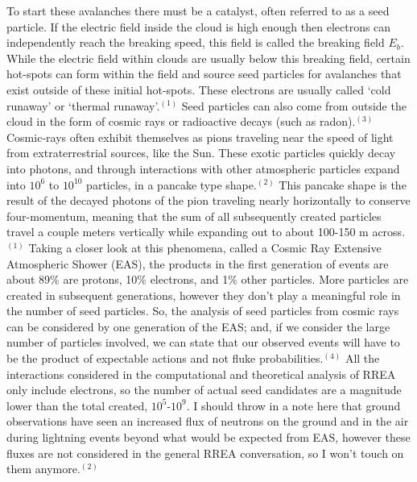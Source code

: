 \documentclass[11pt]{article}
\begin{document}
\begin{multicols*}{2}
    To start these avalanches there must be a catalyst, often referred to as a seed particle. If the electric field inside the cloud is high enough then electrons can independently reach the breaking speed, this field is called the breaking field $E_b$. While the electric field within clouds are usually below this breaking field, certain hot-spots can form within the field and source seed particles for avalanches that exist outside of these initial hot-spots. These electrons are usually called `cold runaway' or `thermal runaway'.$^{(1)}$ Seed particles can also come from outside the cloud in the form of cosmic rays or radioactive decays (such as radon).$^{(3)}$ Cosmic-rays often exhibit themselves as pions traveling near the speed of light from extraterrestrial sources, like the Sun. These exotic particles quickly decay into photons, and through interactions with other atmospheric particles expand into $10^6$ to $10^{10}$ particles, in a pancake type shape.$^{(2)}$ This pancake shape is the result of the decayed photons of the pion traveling nearly horizontally to conserve four-momentum, meaning that the sum of all subsequently created particles travel a couple meters vertically while expanding out to about 100-150 m across.$^{(1)}$ Taking a closer look at this phenomena, called a Cosmic Ray Extensive Atmospheric Shower (EAS), the products in the first generation of events are about 89\% are protons, 10\% electrons, and 1\% other particles. More particles are created in subsequent generations, however they don’t play a meaningful role in the number of seed particles. So, the analysis of seed particles from cosmic rays can be considered by one generation of the EAS; and, if we consider the large number of particles involved, we can state that our observed events will have to be the product of expectable actions and not fluke probabilities.$^{(4)}$ All the interactions considered in the computational and theoretical analysis of RREA only include electrons, so the number of actual seed candidates are a magnitude lower than the total created, $10^5$-$10^9$. I should throw in a note here that ground observations have seen an increased flux of neutrons on the ground and in the air during lightning events beyond what would be expected from EAS, however these fluxes are not considered in the general RREA conversation, so I won't touch on them anymore.$^{(2)}$
    

\end{multicols*}
\end{document}
